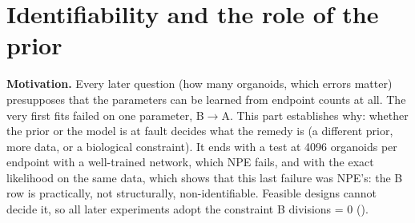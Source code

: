 \documentclass[10pt,a4paper]{article}
\newcommand{\code}[1]{\texttt{\detokenize{#1}}}
\newcommand{\partintro}[1]{\begin{keybox}#1\end{keybox}}
\begin{document}
\clearpage
\part{Identifiability and the role of the prior}\label{part:ident}
\partintro{\textbf{Motivation.} Every later question (how many organoids, which errors matter) presupposes that the parameters can be learned from endpoint counts at all. The very first fits failed on one parameter, B$\to$A. This part establishes why: whether the prior or the model is at fault decides what the remedy is (a different prior, more data, or a biological constraint). It ends with a test at 4096 organoids per endpoint with a well-trained network, which NPE fails, and with the exact likelihood on the same data, which shows that this last failure was NPE's: the B row is practically, not structurally, non-identifiable. Feasible designs cannot decide it, so all later experiments adopt the constraint B divisions = 0 (\code{reversible_ab}).}
\end{document}
